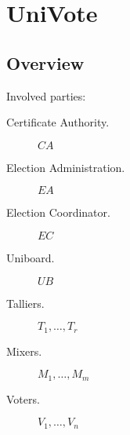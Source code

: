 \documentclass[bibtotoc,halfparskip,oneside]{scrreprt}
\newcommand{\CA}{\ensuremath{\mathit{CA}}\xspace}
\newcommand{\EA}{\ensuremath{\mathit{EA}}\xspace}
\newcommand{\EC}{\ensuremath{\mathit{EC}}\xspace}
\newcommand{\UB}{\ensuremath{\mathit{UB}}\xspace}
\newcommand{\Tallier}[1]{\ensuremath{\mathit{T}_{#1}}\xspace}
\newcommand{\Mixer}[1]{\ensuremath{\mathit{M}_{#1}}\xspace}
\newcommand{\Voter}[1]{\ensuremath{\mathit{V}_{#1}}\xspace}
\begin{document}




\chapter{UniVote}

\section{Overview}

Involved parties:

\begin{description}
	\item[Certificate Authority.] \CA
	\item[Election Administration.] \EA
	\item[Election Coordinator.] \EC
	\item[Uniboard.] \UB
	\item[Talliers.] $\Tallier{1},\ldots,\Tallier{r}$
	\item[Mixers.] $\Mixer{1},\ldots,\Mixer{m}$
	\item[Voters.] $\Voter{1},\ldots,\Voter{n}$
\end{description}
\end{document}
